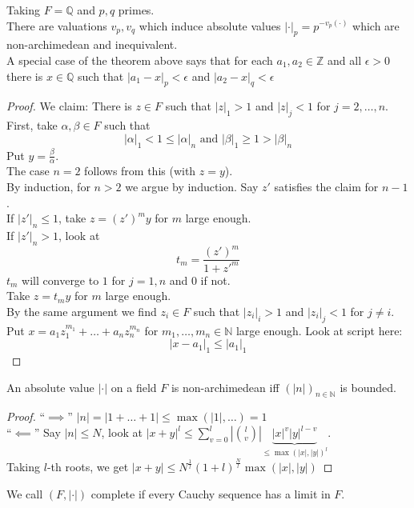 \documentclass[../main.tex]{subfiles}
\begin{document}
\begin{rmq}
Taking $F= \mathbb{Q}$ and $p,q$ primes.\\
There are valuations $v_p,v_q$ which induce absolute values $|\cdot|_p = p^{- v_p( \cdot) }$ which are non-archimedean and inequivalent.\\
A special case of the theorem above says that for each $a_1,a_2\in \mathbb{Z}$ and all $\epsilon>0$  there is $x\in \mathbb{Q}$ such that $|a_1-x|_p < \epsilon	$ and $|a_2-x|_q < \epsilon$
\end{rmq}
\begin{proof}
We claim: There is $z\in F$ such that $|z|_1>1$ and $|z|_j <1$ for $j = 2 ,\ldots,n$.\\
First, take $\alpha,\beta\in F$ such that
\[ 
|\alpha|_1 < 1 \leq |\alpha|_n \text{ and   } |\beta|_1 \geq 1 > |\beta|_n
\]
Put $y= \frac{\beta}{\alpha}$.\\
The case $n=2$ follows from this (with $z=y$).\\
By induction, for $n>2$ we argue by induction. Say $z'$ satisfies the claim for $n-1$.\\
If $|z'|_n \leq 1$, take $z= ( z')^{m}y$ for $m$ large enough.\\
If $|z'|_n >1$, look at 
\[ 
t_m = \frac{( z') ^{m}}{1+ z'^{m}}
\]
$t_m$ will converge to $1$ for $j= 1,n$ and $0$ if not.\\
Take $z= t_m y$ for $m$ large enough.\\
By the same argument we find $z_i \in F$ such that $|z_i|_i >1$ and $|z_i|_j<1$ for $j \neq i$.\\
Put $x= a_1 z_1^{m_1}+ \ldots + a_n z_n^{m_n}$ for $m_1,\ldots,m_n \in \mathbb{N}$ large enough.
Look at script here:
\[ 
|x-a_1|_1 \leq  |a_1|_1 
\]

\end{proof}
\begin{propo}
An absolute value $|\cdot|$ on a field $F$ is non-archimedean iff $ ( |n|)_{n \in \mathbb{N}} $ is bounded.
\end{propo}
\begin{proof}
``$\implies$'' $|n| = |1+ \ldots+1| \leq \max( |1|,\ldots) = 1$ \\
``$\impliedby$'' Say $|n| \leq N$, look at $|x+y|^{l} \leq \sum_{v=0}^{ l} | \binom{l}{v}| \underbrace{|x|^{v}|y|^{l-v}}_{ \leq \max( |x|,|y|)^{l}}$.\\
Taking $l$-th roots, we get $|x+y| \leq N^{\frac{1}{l} } ( 1+l)^{\frac{N}{l}}\max( |x|,|y|) $ 
\end{proof}
\begin{defn}
	We call $( F,|\cdot|) $ complete if every Cauchy sequence has a limit in $F$.
\end{defn}
\end{document}
